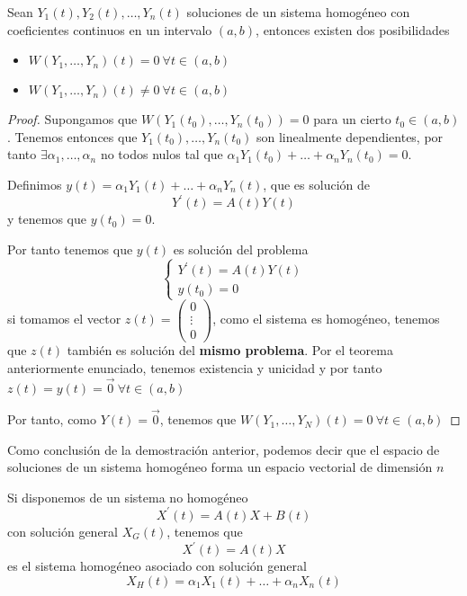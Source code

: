 \documentclass{mathnotes}
\begin{document}
\begin{theorem}
Sean $Y_1(t), Y_2(t), \hdots, Y_n(t)$ soluciones de un sistema homogéneo con coeficientes continuos en un intervalo $(a,b)$, entonces existen dos posibilidades
\begin{itemize}
\item $W(Y_1, \hdots, Y_n)(t) = 0\ \forall t \in (a, b)$
\item $W(Y_1, \hdots, Y_n)(t) \neq 0\ \forall t \in (a, b)$
\end{itemize}
\end{theorem}

\begin{proof}
Supongamos que $W(Y_1(t_0), \hdots, Y_n(t_0)) = 0$ para un cierto $t_0 \in (a,b)$. Tenemos entonces que $Y_1(t_0), \hdots, Y_n(t_0)$ son linealmente dependientes, por tanto $\exists \alpha_1,\hdots,\alpha_n$ no todos nulos tal que $\alpha_1Y_1(t_0)+\hdots+\alpha_nY_n(t_0) = 0$.

Definimos $y(t) = \alpha_1Y_1(t)+\hdots+\alpha_nY_n(t)$, que es solución de $$Y^\prime(t) = A(t)Y(t)$$ y tenemos que $y(t_0) = 0$.

Por tanto tenemos que $y(t)$ es solución del problema
\begin{equation*}
  \left\lbrace
  \begin{array}{l}
     Y^\prime(t) = A(t)Y(t)\\
     y(t_0) = 0
  \end{array}
  \right.
\end{equation*}
si tomamos el vector $z(t) = \begin{pmatrix}
0\\\vdots\\0
\end{pmatrix}$, como el sistema es homogéneo, tenemos que $z(t)$ también es solución del \textbf{mismo problema}. Por el teorema anteriormente enunciado, tenemos existencia y unicidad y por tanto $z(t) = y(t) = \vec{0}\ \forall t \in (a,b)$

Por tanto, como $Y(t) = \vec{0}$, tenemos que $W(Y_1,\hdots,Y_N)(t) = 0\ \forall t\in (a,b)$
\end{proof}

Como conclusión de la demostración anterior, podemos decir que el espacio de soluciones de un sistema homogéneo forma un espacio vectorial de dimensión $n$

\vspace{5mm}
\obs

Si disponemos de un sistema no homogéneo $$X^\prime(t) = A(t)X+B(t)$$
con solución general $X_G(t)$, tenemos que $$X^\prime(t) = A(t)X$$ es el sistema homogéneo asociado con solución general $$X_H(t) = \alpha_1X_1(t)+\hdots+\alpha_nX_n(t)$$
\end{document}
